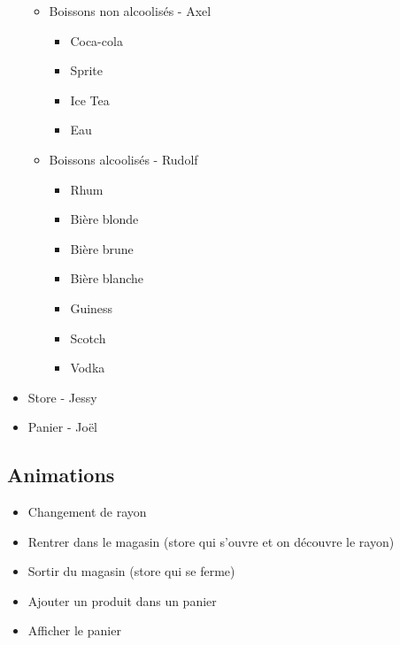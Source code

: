 \documentclass[a4paper]{article}
\begin{document}
\begin{itemize}
\begin{itemize}
\item Boissons non alcoolisés - Axel
\begin{itemize}
\item Coca-cola
\item Sprite
\item Ice Tea
\item Eau
\end{itemize}
\item Boissons alcoolisés - Rudolf
\begin{itemize}
\item Rhum
\item Bière blonde
\item Bière brune
\item Bière blanche
\item Guiness
\item Scotch
\item Vodka
\end{itemize}
\end{itemize}
\item Store - Jessy
\item Panier - Joël
\end{itemize}
\subsection{Animations}
\begin{itemize}
\item Changement de rayon
\item Rentrer dans le magasin (store qui s'ouvre et on découvre le rayon)
\item Sortir du magasin (store qui se ferme)
\item Ajouter un produit dans un panier
\item Afficher le panier
\end{itemize}
\end{document}
